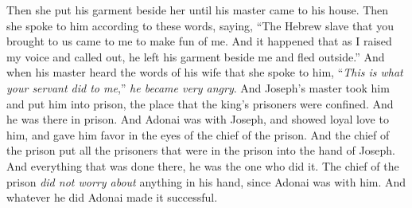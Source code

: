 \begin{biblechapter}
\verse Then she put his garment beside her until his master came to his house.
\verse Then she spoke to him according to these words, saying, “The Hebrew slave that you brought to us came to me to make fun of me.
\verse And it happened that as I raised my voice and called out, he left his garment beside me and fled outside.”
\verse And when his master heard the words of his wife that she spoke to him, “\textit{This is what your servant did to me},” \textit{he became very angry}.
\verse And Joseph’s master took him and put him into prison, the place that the king’s prisoners were confined. And he was there in prison.
\verse And Adonai was with Joseph, and showed loyal love to him, and gave him favor in the eyes of the chief of the prison.
\verse And the chief of the prison put all the prisoners that were in the prison into the hand of Joseph. And everything that was done there, he was the one who did it.
\verse The chief of the prison \textit{did not worry about} anything in his hand, since Adonai was with him. And whatever he did Adonai made it successful.
\end{biblechapter}

